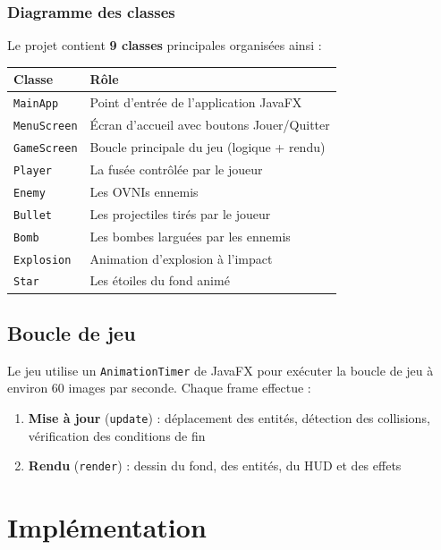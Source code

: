 \documentclass[12pt,a4paper]{report}
\begin{document}
\subsection{Diagramme des classes}
Le projet contient \textbf{9 classes} principales organisées ainsi :

\begin{center}
\begin{tabular}{|l|l|}
\hline
\textbf{Classe} & \textbf{Rôle} \\
\hline
\texttt{MainApp} & Point d'entrée de l'application JavaFX \\
\texttt{MenuScreen} & Écran d'accueil avec boutons Jouer/Quitter \\
\texttt{GameScreen} & Boucle principale du jeu (logique + rendu) \\
\texttt{Player} & La fusée contrôlée par le joueur \\
\texttt{Enemy} & Les OVNIs ennemis \\
\texttt{Bullet} & Les projectiles tirés par le joueur \\
\texttt{Bomb} & Les bombes larguées par les ennemis \\
\texttt{Explosion} & Animation d'explosion à l'impact \\
\texttt{Star} & Les étoiles du fond animé \\
\hline
\end{tabular}
\end{center}

\section{Boucle de jeu}
Le jeu utilise un \texttt{AnimationTimer} de JavaFX pour exécuter la boucle de jeu à environ 60 images par seconde. Chaque frame effectue :

\begin{enumerate}[leftmargin=1.5cm]
  \item \textbf{Mise à jour} (\texttt{update}) : déplacement des entités, détection des collisions, vérification des conditions de fin
  \item \textbf{Rendu} (\texttt{render}) : dessin du fond, des entités, du HUD et des effets
\end{enumerate}

\chapter{Implémentation}
\end{document}
